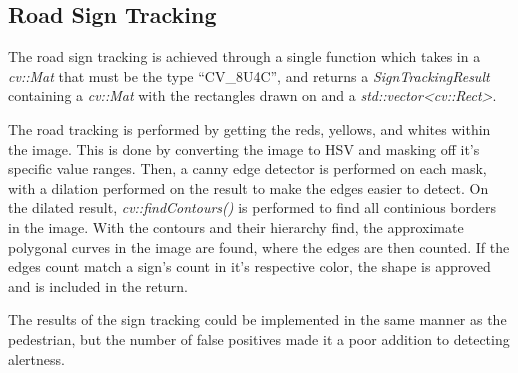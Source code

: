 \subsection{Road Sign Tracking}

The road sign tracking is achieved through a single function which takes in a \emph{cv::Mat} that must be the type ``CV\_8U4C'', and returns a \emph{SignTrackingResult} containing a \emph{cv::Mat} with the rectangles drawn on and a \emph{std::vector<cv::Rect>}.

The road tracking is performed by getting the reds, yellows, and whites within the image. 
This is done by converting the image to HSV and masking off it's specific value ranges.
Then, a canny edge detector is performed on each mask, with a dilation performed on the result to make the edges easier to detect.
On the dilated result, \emph{cv::findContours()} is performed to find all continious borders in the image.
With the contours and their hierarchy find, the approximate polygonal curves in the image are found, where the edges are then counted.
If the edges count match a sign's count in it's respective color, the shape is approved and is included in the return.

The results of the sign tracking could be implemented in the same manner as the pedestrian, but the number of false positives made it a poor addition to detecting alertness.